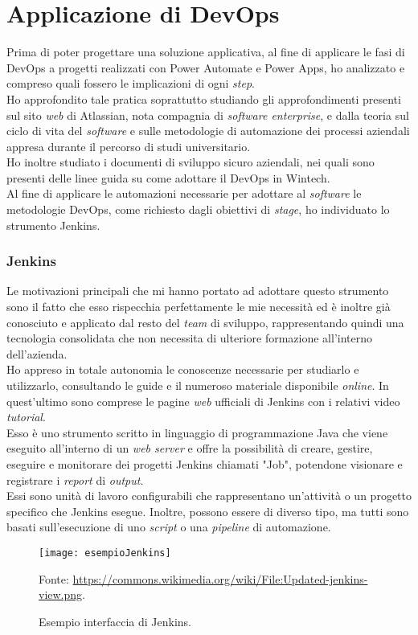 \section{Applicazione di DevOps}%
Prima di poter progettare una soluzione applicativa, al fine di applicare le fasi di \gls{DevOps} a progetti realizzati con Power Automate e Power Apps, ho analizzato e compreso quali fossero le implicazioni di ogni \emph{step}.\\
Ho approfondito tale pratica soprattutto studiando gli approfondimenti presenti sul sito \emph{web} di Atlassian, nota compagnia di \emph{software enterprise}, e dalla teoria sul ciclo di vita del \emph{software} e sulle metodologie di automazione dei processi aziendali appresa durante il percorso di studi universitario.\\
Ho inoltre studiato i documenti di sviluppo sicuro aziendali, nei quali sono presenti delle linee guida su come adottare il \gls{DevOps} in Wintech.\\
Al fine di applicare le automazioni necessarie per adottare al \emph{software} le metodologie \gls{DevOps}, come richiesto dagli obiettivi di \emph{stage}, ho individuato lo strumento Jenkins.\\

\subsubsection*{Jenkins}
Le motivazioni principali che mi hanno portato ad adottare questo strumento sono il fatto che esso rispecchia perfettamente le mie necessità ed è inoltre già conosciuto e applicato dal resto del \emph{team} di sviluppo, rappresentando quindi una tecnologia consolidata che non necessita di ulteriore formazione all'interno dell'azienda.\\
Ho appreso in totale autonomia le conoscenze necessarie per studiarlo e utilizzarlo, consultando le guide e il numeroso materiale disponibile \emph{online}. In quest'ultimo sono comprese le pagine \emph{web} ufficiali di Jenkins con i relativi video \emph{tutorial}.\\
Esso è uno strumento scritto in linguaggio di programmazione Java che viene eseguito all'interno di un \emph{web server} e offre la possibilità di creare, gestire, eseguire e monitorare dei progetti Jenkins chiamati "Job", potendone visionare e registrare i \emph{report} di \emph{output}.\\
Essi sono unità di lavoro configurabili che rappresentano un'attività o un progetto specifico che Jenkins esegue. Inoltre, possono essere di diverso tipo, ma tutti sono basati sull'esecuzione di uno \emph{script} o una \emph{pipeline} di automazione.
\begin{figure}[htbp] 
    \centering 
    \texttt{[image: esempioJenkins]} 
    \caption{Esempio interfaccia di Jenkins.}
    \label{fig:esempioJenkins}
    \vspace{1mm}
    Fonte: \url{https://commons.wikimedia.org/wiki/File:Updated-jenkins-view.png}.
\end{figure}

